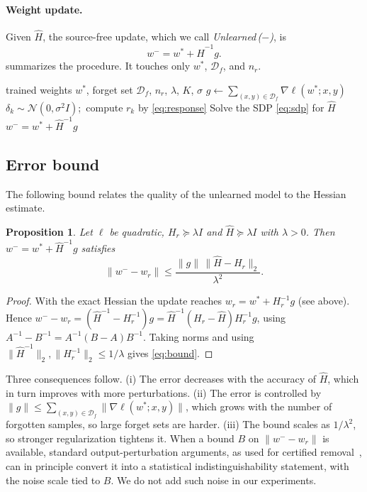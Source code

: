 \documentclass[10pt,twocolumn,letterpaper]{article}
\newtheorem{proposition}{Proposition}
\newcommand{\Df}{\mathcal{D}_f}
\newcommand{\Hr}{H_r}
\newcommand{\wstar}{w^{*}}
\newcommand{\wminus}{w^{-}}
\newcommand{\norm}[1]{\lVert #1\rVert}
\begin{document}
\paragraph{Weight update.} Given $\hat H$, the source-free update, which we call \emph{Unlearned\,($-$)}, is
\begin{equation}
  \wminus=\wstar+\hat H^{-1}g .
  \label{eq:update}
\end{equation}
 summarizes the procedure. It touches only $\wstar$, $\Df$, and $n_r$.

\begin{algorithm}[t]
\caption{Source-free unlearning (Unlearned\,($-$))}
\label{alg:method}
\begin{algorithmic}[1]
\Require trained weights $\wstar$, forget set $\Df$, $n_r$, $\lambda$, $K$, $\sigma$
\State $g\leftarrow\sum_{(x,y)\in\Df}\nabla\ell(\wstar;x,y)$
  \State $\delta_k\sim\mathcal{N}(0,\sigma^2I)$;\ compute $r_k$ by \cref{eq:response}
\EndFor
\State Solve the SDP \cref{eq:sdp} for $\hat H$
\State \Return $\wminus=\wstar+\hat H^{-1}g$
\end{algorithmic}
\end{algorithm}

\subsection{Error bound}
The following bound relates the quality of the unlearned model to the Hessian estimate.
\begin{proposition}
\label{prop:bound}
Let $\ell$ be quadratic, $\Hr\succeq\lambda I$ and $\hat H\succeq\lambda I$ with $\lambda>0$. Then $\wminus=\wstar+\hat H^{-1}g$ satisfies
\begin{equation}
  \norm{\wminus-w_r}\le\frac{\norm{g}\,\norm{\hat H-\Hr}_2}{\lambda^{2}} .
  \label{eq:bound}
\end{equation}
\end{proposition}
\begin{proof}
With the exact Hessian the update reaches $w_r=\wstar+\Hr^{-1}g$ (see above). Hence $\wminus-w_r=(\hat H^{-1}-\Hr^{-1})g=\hat H^{-1}(\Hr-\hat H)\Hr^{-1}g$, using $A^{-1}-B^{-1}=A^{-1}(B-A)B^{-1}$. Taking norms and using $\norm{\hat H^{-1}}_2,\norm{\Hr^{-1}}_2\le 1/\lambda$ gives \cref{eq:bound}.
\end{proof}
Three consequences follow. (i) The error decreases with the accuracy of $\hat H$, which in turn improves with more perturbations. (ii) The error is controlled by $\norm{g}\le\sum_{(x,y)\in\Df}\norm{\nabla\ell(\wstar;x,y)}$, which grows with the number of forgotten samples, so large forget sets are harder. (iii) The bound scales as $1/\lambda^2$, so stronger regularization tightens it. When a bound $B$ on $\norm{\wminus-w_r}$ is available, standard output-perturbation arguments, as used for certified removal~\cite{guo2020certified}, can in principle convert it into a statistical indistinguishability statement, with the noise scale tied to $B$. We do not add such noise in our experiments.
\end{document}
